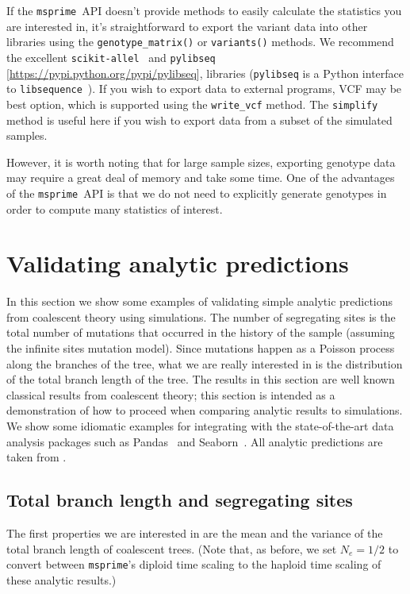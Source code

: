 \documentclass[graybox]{svmult}
\newcommand{\msprime}[0]{\texttt{msprime}}
\begin{document}
If the \msprime\ API doesn't provide methods to easily calculate the
statistics you are interested in, it's straightforward to export the
variant data into other libraries using the \texttt{genotype\_matrix()}
or \texttt{variants()} methods. We recommend the excellent
\texttt{scikit-allel}~\citep{miles2017scikit} and
\texttt{pylibseq} [\url{https://pypi.python.org/pypi/pylibseq}],
libraries (\texttt{pylibseq} is a Python interface to
\texttt{libsequence}~\citep{thornton2003libsequence}). If you wish to export data to
external programs, VCF may be best option, which is supported using the
\texttt{write\_vcf} method. The \texttt{simplify} method is useful here
if you wish to export data from a subset of the simulated samples.

However, it is worth noting that for large sample sizes, exporting
genotype data may require a great deal of memory and take some time. One
of the advantages of the \msprime\ API is that we do not need to
explicitly generate genotypes in order to compute many
statistics of interest.

\section{Validating analytic predictions}\label{validating-analytical-predictions}

In this section we show some examples of validating simple analytic
predictions from coalescent theory using simulations. The number of
segregating sites is the total number of mutations that occurred in the
history of the sample (assuming the infinite sites mutation model).
Since mutations happen as a Poisson process along the branches of the
tree, what we are really interested in is the distribution of the total
branch length of the tree. The results in this section are well known
classical results from coalescent theory; this section is intended as a
demonstration of how to proceed when comparing analytic results to
simulations. We show some idiomatic examples for integrating with
the state-of-the-art data analysis packages such
as Pandas~\citep{mckinney2010data} and Seaborn~\citep{michael_waskom_2017_883859}.
All analytic predictions are taken from \cite{wakely2008coalescent}.

\subsection{Total branch length and segregating sites}
The first properties we are interested in are the mean and the
variance of the total branch length of coalescent trees. (Note that, as
before, we set \(N_e=1/2\) to convert between \msprime's diploid time
scaling to the haploid time scaling of these analytic results.)
\end{document}
